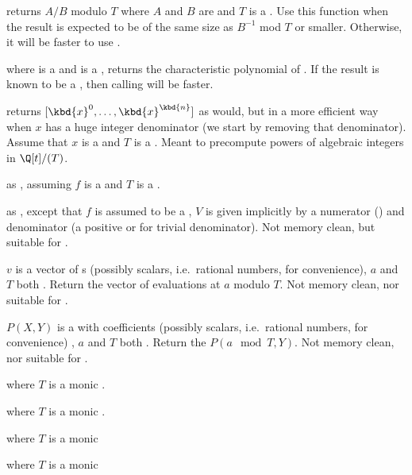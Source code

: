  returns $A/B$ modulo $T$
where $A$ and $B$ are  and $T$ is a . Use this function
when the result is expected to be of the same size as $B^{-1}$ mod $T$
or smaller.
Otherwise, it will be faster to use .

 where  is a  and
 is a , returns the characteristic polynomial of .
If the result is known to be a , then calling  will
be faster.

 returns $[\kbd{x}^0, \dots,
\kbd{x}^\kbd{n}]$ as  would, but in a more efficient way when
$x$ has a huge integer denominator (we start by removing that denominator).
Assume that $x$ is a  and $T$ is a . Meant to precompute
powers of algebraic integers in $\Q[t]/(T)$.

 as , assuming $f$
is a  and $T$ is a .

 as ,
except that $f$ is assumed to be a , $V$ is given implicitly
by a numerator  () and denominator  (a positive
 or  for trivial denominator). Not memory clean, but
suitable for .

 $v$ is a vector of s
(possibly scalars, i.e.~rational numbers, for convenience), $a$ and $T$ both
. Return the vector of evaluations at $a$ modulo $T$.
Not memory clean, nor suitable for .

 $P(X,Y)$ is a  with
 coefficients (possibly scalars, i.e.~rational numbers, for
convenience) , $a$ and $T$ both . Return the  $P(a \mod
T, Y)$. Not memory clean, nor suitable for .


 where $T$ is a monic .

 where $T$ is a monic .

 where $T$ is a monic 

 where $T$ is a monic 

